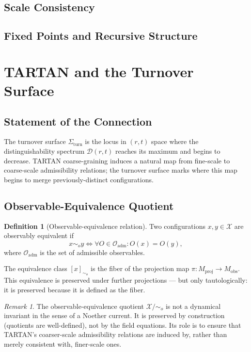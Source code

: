 \documentclass[12pt,a4paper,twoside,openright]{book}
\theoremstyle{plain}
\theoremstyle{definition}
\newtheorem{definition}[theorem]{Definition}
\theoremstyle{remark}
\newtheorem{remark}[theorem]{Remark}
\newcommand{\Mproj}{M_{\mathrm{proj}}}
\newcommand{\Mobs}{M_{\mathrm{obs}}}
\newcommand{\Dspec}{\mathcal{D}}
\newcommand{\Turn}{\Sigma_{\mathrm{turn}}}
\begin{document}
\subsection{Scale Consistency}
\subsection{Fixed Points and Recursive Structure}

\section{TARTAN and the Turnover Surface}


\subsection{Statement of the Connection}

The turnover surface $\Turn$ is the locus in $(r,t)$ space where the distinguishability spectrum $\Dspec(r,t)$ reaches its maximum and begins to decrease. TARTAN coarse-graining induces a natural map from fine-scale to coarse-scale admissibility relations; the turnover surface marks where this map begins to merge previously-distinct configurations.

\subsection{Observable-Equivalence Quotient}

\begin{definition}[Observable-equivalence relation]
Two configurations $x, y \in \mathcal{X}$ are observably equivalent if
\[
x \sim_o y \iff \forall O \in \mathcal{O}_{\mathrm{adm}} : O(x) = O(y),
\]
where $\mathcal{O}_{\mathrm{adm}}$ is the set of admissible observables.
\end{definition}

The equivalence class $[x]_{\sim_o}$ is the fiber of the projection map $\pi: \Mproj \to \Mobs$. This equivalence is preserved under further projections — but only tautologically: it is preserved because it is defined as the fiber.

\begin{remark}
The observable-equivalence quotient $\mathcal{X}/{\sim_o}$ is not a dynamical invariant in the sense of a Noether current. It is preserved by construction (quotients are well-defined), not by the field equations. Its role is to ensure that TARTAN's coarser-scale admissibility relations are induced by, rather than merely consistent with, finer-scale ones.
\end{remark}
\end{document}
